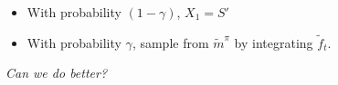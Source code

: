 \documentclass{beamer}
\begin{document}
    \begin{frame}
    \begin{itemize}
        \item With probability \( (1 - \gamma) \), \( X_{1} = S' \)
        \item With probability \( \gamma \), sample from \( \tilde{m}^{\pi} \) by integrating \( \tilde{f}_t \).
    \end{itemize}
    \vspace*{1cm}
        \begin{center}
            \emph{Can we do better?}
        \end{center}
    \end{frame}
    
\end{document}
